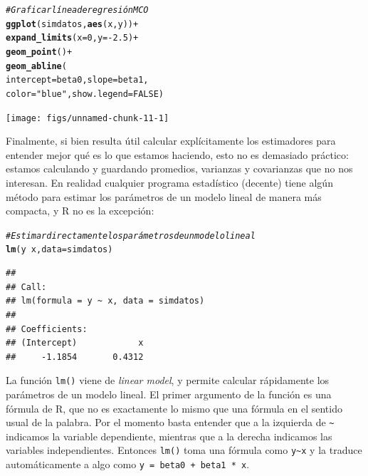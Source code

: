 \documentclass{report}\usepackage[]{graphicx}\usepackage[]{color}
\makeatletter
\newcommand{\hlnum}[1]{\textcolor[rgb]{0.686,0.059,0.569}{#1}}%
\newcommand{\hlstr}[1]{\textcolor[rgb]{0.192,0.494,0.8}{#1}}%
\newcommand{\hlcom}[1]{\textcolor[rgb]{0.678,0.584,0.686}{\textit{#1}}}%
\newcommand{\hlopt}[1]{\textcolor[rgb]{0,0,0}{#1}}%
\newcommand{\hlstd}[1]{\textcolor[rgb]{0.345,0.345,0.345}{#1}}%
\newcommand{\hlkwc}[1]{\textcolor[rgb]{0.333,0.667,0.333}{#1}}%
\newcommand{\hlkwd}[1]{\textcolor[rgb]{0.737,0.353,0.396}{\textbf{#1}}}%
\newenvironment{kframe}{%
 \def\at@end@of@kframe{}%
 \ifinner\ifhmode%
  \def\at@end@of@kframe{\end{minipage}}%
  \begin{minipage}{\columnwidth}%
 \fi\fi%
 \def\FrameCommand##1{\hskip\@totalleftmargin \hskip-\fboxsep
 \colorbox{shadecolor}{##1}\hskip-\fboxsep
     \hskip-\linewidth \hskip-\@totalleftmargin \hskip\columnwidth}%
 \MakeFramed {\advance\hsize-\width
   \@totalleftmargin\z@ \linewidth\hsize
   \@setminipage}}%
 {\par\unskip\endMakeFramed%
 \at@end@of@kframe}
\newenvironment{knitrout}{}{} %
\newcommand*{\eng}[1]{\textsl{#1}}
\makeatother
\begin{document}
\begin{knitrout}
\color{fgcolor}\begin{kframe}
\begin{alltt}
\hlcom{# Graficar línea de regresión MCO}
\hlkwd{ggplot}\hlstd{(simdatos,} \hlkwd{aes}\hlstd{(x,y))} \hlopt{+}
  \hlkwd{expand_limits}\hlstd{(}\hlkwc{x} \hlstd{=} \hlnum{0}\hlstd{,} \hlkwc{y} \hlstd{=} \hlopt{-}\hlnum{2.5}\hlstd{)} \hlopt{+}
  \hlkwd{geom_point}\hlstd{()} \hlopt{+}
  \hlkwd{geom_abline}\hlstd{(}
    \hlkwc{intercept} \hlstd{= beta0,} \hlkwc{slope} \hlstd{= beta1,}
    \hlkwc{color} \hlstd{=} \hlstr{"blue"}\hlstd{,} \hlkwc{show.legend} \hlstd{=} \hlnum{FALSE} \hlstd{)}
\end{alltt}
\end{kframe}

{\centering \texttt{[image: figs/unnamed-chunk-11-1]} 

}



\end{knitrout}

Finalmente, si bien resulta útil calcular explícitamente los estimadores para entender mejor qué es lo que estamos haciendo, esto no es demasiado práctico: estamos calculando y guardando promedios, varianzas y covarianzas que no nos interesan.
En realidad cualquier programa estadístico (decente) tiene algún método para estimar los parámetros de un modelo lineal de manera más compacta, y R no es la excepción:

\begin{knitrout}
\color{fgcolor}\begin{kframe}
\begin{alltt}
\hlcom{# Estimar directamente los parámetros de un modelo lineal}
\hlkwd{lm}\hlstd{(y} \hlopt{~} \hlstd{x,} \hlkwc{data} \hlstd{= simdatos)}
\end{alltt}
\begin{verbatim}
## 
## Call:
## lm(formula = y ~ x, data = simdatos)
## 
## Coefficients:
## (Intercept)            x  
##     -1.1854       0.4312
\end{verbatim}
\end{kframe}
\end{knitrout}

\begin{Rbox}
La función \verb|lm()| viene de \eng{linear model}, y permite calcular rápidamente los parámetros de un modelo lineal. El primer argumento de la función es una fórmula de R, que no es exactamente lo mismo que una fórmula en el sentido usual de la palabra. Por el momento basta entender que a la izquierda de \verb|~| indicamos la variable dependiente, mientras que a la derecha indicamos las variables independientes. Entonces \verb|lm()| toma una fórmula como \verb|y~x| y la traduce automáticamente a algo como \verb|y = beta0 + beta1 * x|.
\end{Rbox}
\end{document}

